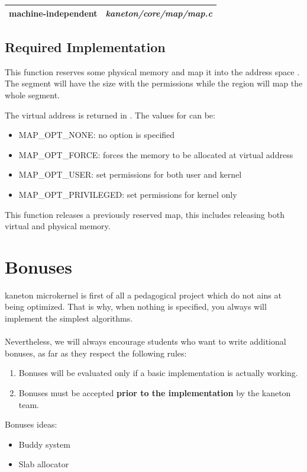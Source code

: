 \begin{tabular}{| l | l |}
  \hline
  machine-independent & {\em kaneton/core/map/map.c}\\\hline
\end{tabular}

\subsection*{Required Implementation}

{
  This function reserves some physical memory and map it into
  the address space .  The segment will have the
  size  with the permissions 
  while the region will map the whole segment.

  The virtual address is returned in . The
  values for  can be:
  \begin{itemize}
  \item {MAP\_OPT\_NONE}: no option is specified
  \item {MAP\_OPT\_FORCE}: forces the memory to be allocated at virtual address 
  \item {MAP\_OPT\_USER}: set permissions for both user and kernel
  \item {MAP\_OPT\_PRIVILEGED}: set permissions for kernel only
  \end{itemize}
}

{
  This function releases a previously reserved map, this
  includes releasing both virtual and physical memory.
}

%
%

\newpage

\section{Bonuses}

kaneton microkernel is first of all a pedagogical project which do not ains at being
optimized. That is why, when nothing is specified, you always will implement the simplest
algorithms.\\
\\
Nevertheless, we will always encourage students who want to write additional bonuses, as far as they respect the following rules:
\begin{enumerate}
\item Bonuses will be evaluated only if a basic implementation is actually working.
\item Bonuses must be accepted \textbf{prior to the implementation} by the kaneton team.
\end{enumerate}

Bonuses ideas:
\begin{itemize}
\item Buddy system
\item Slab allocator
\end{itemize}
